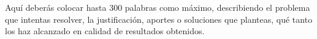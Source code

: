 \begin{resumen}
Aquí deberás colocar hasta 300 palabras como máximo, describiendo el problema que intentas resolver, la justificación, aportes o soluciones que planteas, qué tanto los haz alcanzado en calidad de resultados obtenidos.
\end{resumen}
